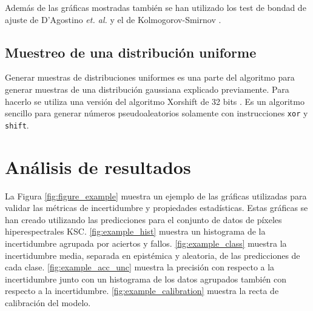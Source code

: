 Además de las gráficas mostradas también se han utilizado los test de bondad de ajuste de D’Agostino \emph{et. al.} \cite{normaltest_1, normaltest_2} y el de Kolmogorov-Smirnov \cite{kstest}.

\subsection{Muestreo de una distribución uniforme}

Generar muestras de distribuciones uniformes es una parte del algoritmo para generar muestras de una distribución gaussiana explicado previamente. Para hacerlo se utiliza una versión del algoritmo Xorshift de 32 bits \cite{xorshift}. Es un algoritmo sencillo para generar números pseudoaleatorios solamente con instrucciones \texttt{xor} y \texttt{shift}.

\section{Análisis de resultados} \label{sec:uncertainty_example}

La Figura \ref{fig:figure_example} muestra un ejemplo de las gráficas utilizadas para validar las métricas de incertidumbre y propiedades estadísticas. Estas gráficas se han creado utilizando las predicciones para el conjunto de datos de píxeles hiperespectrales KSC. \ref{fig:example_hist} muestra un histograma de la incertidumbre agrupada por aciertos y fallos. \ref{fig:example_class} muestra la incertidumbre media, separada en epistémica y aleatoria, de las predicciones de cada clase. \ref{fig:example_acc_unc} muestra la precisión con respecto a la incertidumbre junto con un histograma de los datos agrupados también con respecto a la incertidumbre. \ref{fig:example_calibration} muestra la recta de calibración del modelo.

